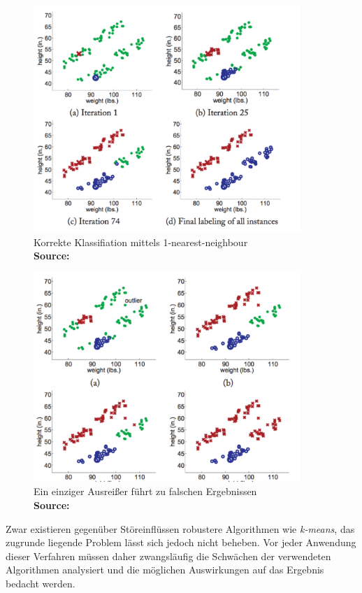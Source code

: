 \documentclass[runningheads,a4paper]{llncs}
\newcommand*{\captionsource}[2]{%
  \caption[{#1}]{%
    #1%
    \\\hspace{\linewidth}%
    \textbf{Source:} #2%
  }%
}
\begin{document}
\begin{figure} [H]
  \centering
  \includegraphics[width=0.9\textwidth]{res/cav.png}
      \captionsource{Korrekte Klassifiation mittels 1-nearest-neighbour}{\cite{zhu_goldberg_2009}}
  \label{fig:cav1}
\end{figure}

\begin{figure} [H]
  \centering
  \includegraphics[width=0.9\textwidth]{res/cav2.png}
      \captionsource{Ein einziger Ausreißer führt zu falschen Ergebnissen}{\cite{zhu_goldberg_2009}}
  \label{fig:cav2}
\end{figure}


Zwar existieren gegenüber Störeinflüssen robustere Algorithmen wie \emph{k-means}, das zugrunde liegende Problem lässt sich jedoch nicht beheben. Vor jeder Anwendung dieser Verfahren müssen daher zwangsläufig die Schwächen der verwendeten Algorithmen analysiert und die möglichen Auswirkungen auf das Ergebnis bedacht werden.
\end{document}
